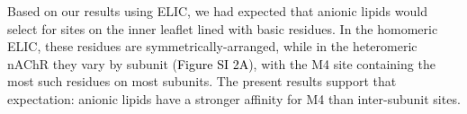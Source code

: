 \documentclass[%
 aip,
 amsmath,amssymb,
 preprint,%
]{revtex4-1}\usepackage{setspace}
\newcommand{\liam}[1]{\textcolor{black}{#1}}
\newcommand{\nachr}{nAChR}
\newcommand{\plgic}{pLGIC}
\begin{document}


Based on our results using ELIC\cite{Tong2019}, we had expected that anionic lipids would select for sites on the inner leaflet lined with basic residues.  In the homomeric ELIC, these residues are symmetrically-arranged, while in the heteromeric \nachr{} they vary by subunit (\liam{Figure SI 2A}), with the M4 site containing the most such residues on most subunits. The present results support that expectation: %
anionic lipids have a stronger affinity for M4 than inter-subunit sites.  %
\end{document}

